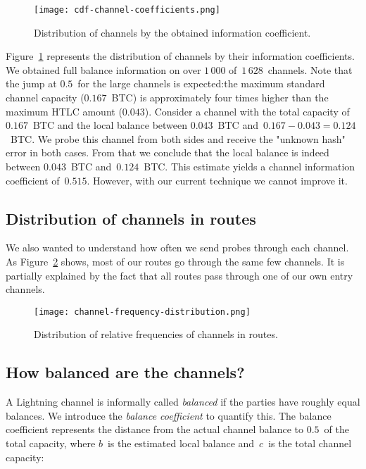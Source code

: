 \begin{figure}[ht]
	\centering
	\texttt{[image: cdf-channel-coefficients.png]}
	\caption{Distribution of channels by the obtained information coefficient.}
	\label{fig:cdf-channel-coefficients}
\end{figure}

Figure~\ref{fig:cdf-channel-coefficients} represents the distribution of channels by their information coefficients.
We obtained full balance information on over $1\,000$ of~$1\,628$~channels.
Note that the jump at $0.5$~for the large channels is expected:the maximum standard channel capacity ($0.167$~BTC) is approximately four times higher than the maximum HTLC amount ($0.043$).
Consider a channel with the total capacity of~$0.167$~BTC and the local balance between $0.043$~BTC and~$0.167 - 0.043 = 0.124$~BTC\@.
We probe this channel from both sides and receive the "unknown hash" error in both cases.
From that we conclude that the local balance is indeed between $0.043$~BTC and~$0.124$~BTC\@.
This estimate yields a channel information coefficient of~$0.515$.
However, with our current technique we cannot improve it.

\subsection{Distribution of channels in routes}

We also wanted to understand how often we send probes through each channel.
As Figure~\ref{fig:channel-frequency-distribution} shows, most of our routes go through the same few channels.
It is partially explained by the fact that all routes pass through one of our own entry channels.

\begin{figure}[h]
	\centering
	\texttt{[image: channel-frequency-distribution.png]}
	\caption{Distribution of relative frequencies of channels in routes.}
	\label{fig:channel-frequency-distribution}
\end{figure}


\subsection{How balanced are the channels?}

A Lightning channel is informally called \textit{balanced} if the parties have roughly equal balances.
We introduce the \textit{balance coefficient} to quantify this.
The balance coefficient represents the distance from the actual channel balance to $0.5$~of the total capacity, where $b$~is the estimated local balance and~$c$~is the total channel capacity:

